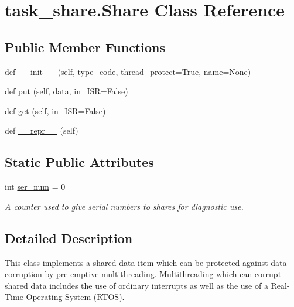 \hypertarget{classtask__share_1_1Share}{}\section{task\+\_\+share.\+Share Class Reference}
\label{classtask__share_1_1Share}
\subsection*{Public Member Functions}
\begin{DoxyCompactItemize}
\item 
def \mbox{\hyperlink{classtask__share_1_1Share_a3139fd0c5d1df7fc15e003892d557b9a}{\+\_\+\+\_\+init\+\_\+\+\_\+}} (self, type\+\_\+code, thread\+\_\+protect=True, name=None)
\item 
def \mbox{\hyperlink{classtask__share_1_1Share_ab449c261f259db176ffeea55ccbf5d96}{put}} (self, data, in\+\_\+\+I\+SR=False)
\item 
def \mbox{\hyperlink{classtask__share_1_1Share_a599cd89ed1cd79af8795a51d8de70d27}{get}} (self, in\+\_\+\+I\+SR=False)
\item 
def \mbox{\hyperlink{classtask__share_1_1Share_a09c1c075ae99ea33030dd9de7b9ae470}{\+\_\+\+\_\+repr\+\_\+\+\_\+}} (self)
\end{DoxyCompactItemize}
\subsection*{Static Public Attributes}
\begin{DoxyCompactItemize}
\item 
int \mbox{\hyperlink{classtask__share_1_1Share_a2e8df029af46fbfd44ef0c2e7e8c7af6}{ser\+\_\+num}} = 0
\begin{DoxyCompactList}\small\item\em A counter used to give serial numbers to shares for diagnostic use. \end{DoxyCompactList}\end{DoxyCompactItemize}


\subsection{Detailed Description}
\begin{DoxyVerb}This class implements a shared data item which can be protected 
against data corruption by pre-emptive multithreading. Multithreading 
which can corrupt shared data includes the use of ordinary interrupts as 
well as the use of a Real-Time Operating System (RTOS). \end{DoxyVerb}
 

